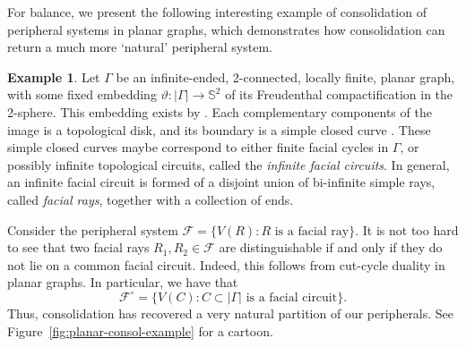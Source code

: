 \documentclass[11pt,a4paper]{amsart}
\theoremstyle{definition}
\newtheorem{example}[theorem]{Example}
\begin{document}
For balance, we present the following interesting example of consolidation of peripheral systems in planar graphs, which demonstrates how consolidation can return a much more `natural' peripheral system.

\begin{example}
    Let $\Gamma$ be an infinite-ended, 2-connected, locally finite, planar graph, with some fixed embedding $\vartheta : |\Gamma| \to \mathbb S^2$ of its Freudenthal compactification in the 2-sphere. This embedding exists by \cite[Lem.~12]{richter20023}. Each complementary components of the image is a topological disk, and its boundary is a simple closed curve \cite[Prop.~3]{richter20023}. These simple closed curves maybe correspond to either finite facial cycles in $\Gamma$, or possibly infinite topological circuits, called the \emph{infinite facial circuits}. In general, an infinite facial circuit is formed of a disjoint union of bi-infinite simple rays, called \emph{facial rays}, together with a collection of ends. 

    Consider the peripheral system $\mathcal F = \{V(R) : \text{$R$ is a facial ray}\}$. It is not too hard to see that two facial rays $R_1, R_2 \in \mathcal F$ are distinguishable if and only if they do not lie on a common facial circuit. Indeed, this follows from cut-cycle duality in planar graphs. In particular, we have that 
    $$
    \mathcal F^\circ = \{V(C) : \text{$C \subset |\Gamma|$ is a facial circuit}\}. 
    $$
    Thus, consolidation has recovered a very natural partition of our peripherals. See Figure~\ref{fig:planar-consol-example} for a cartoon.
\end{example}
\end{document}
